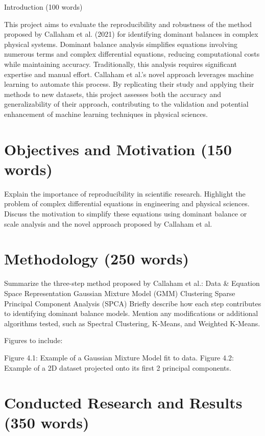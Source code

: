 \documentclass[12pt]{report} %
\begin{document}
Introduction (100 words)


This project aims to evaluate the reproducibility and robustness of the method proposed by Callaham et al. (2021) for identifying dominant balances in complex physical systems. Dominant balance analysis simplifies equations involving numerous terms and complex differential equations, reducing computational costs while maintaining accuracy. Traditionally, this analysis requires significant expertise and manual effort. Callaham et al.’s novel approach leverages machine learning to automate this process. By replicating their study and applying their methods to new datasets, this project assesses both the accuracy and generalizability of their approach, contributing to the validation and potential enhancement of machine learning techniques in physical sciences.


\chapter{Objectives and Motivation (150 words)}

Explain the importance of reproducibility in scientific research.
Highlight the problem of complex differential equations in engineering and physical sciences.
Discuss the motivation to simplify these equations using dominant balance or scale analysis and the novel approach proposed by Callaham et al.


\chapter{Methodology (250 words)}

Summarize the three-step method proposed by Callaham et al.:
Data \& Equation Space Representation
Gaussian Mixture Model (GMM) Clustering
Sparse Principal Component Analysis (SPCA)
Briefly describe how each step contributes to identifying dominant balance models.
Mention any modifications or additional algorithms tested, such as Spectral Clustering, K-Means, and Weighted K-Means.

Figures to include:

Figure 4.1: Example of a Gaussian Mixture Model fit to data.
Figure 4.2: Example of a 2D dataset projected onto its first 2 principal components.


\chapter{Conducted Research and Results (350 words)}
\end{document}
